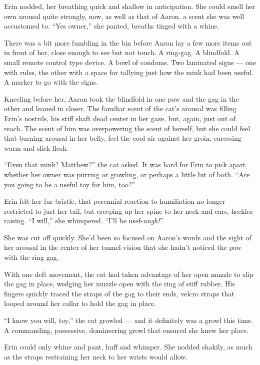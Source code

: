 \documentclass[12pt,letterpaper,oneside]{memoir}
\begin{document}
  Erin nodded, her breathing quick and shallow in anticipation. She could smell her own arousal quite strongly, now, as well as that of Aaron, a scent she was well accustomed to. ``Yes owner,'' she panted, breaths tinged with a whine.

  There was a bit more fumbling in the bin before Aaron lay a few more items out in front of her, close enough to see but not touch. A ring-gag. A blindfold. A small remote control type device. A bowl of condoms. Two laminated signs --- one with rules, the other with a space for tallying just how the mink had been useful. A marker to go with the signs.

  Kneeling before her, Aaron took the blindfold in one paw and the gag in the other and leaned in closer. The familiar scent of the cat's arousal was filling Erin's nostrils, his stiff shaft dead center in her gaze, but, again, just out of reach. The scent of him was overpowering the scent of herself, but she could feel that burning arousal in her belly, feel the cool air against her groin, caressing warm and slick flesh.

  ``Even that mink? Matthew?'' the cat asked. It was hard for Erin to pick apart whether her owner was purring or growling, or perhaps a little bit of both. ``Are you going to be a useful toy for him, too?''

  Erin felt her fur bristle, that perennial reaction to humiliation no longer restricted to just her tail, but creeping up her spine to her neck and ears, heckles raising. ``I will,'' she whimpered. ``I'll be usef-\textit{nngh!}''

  She was cut off quickly. She'd been so focused on Aaron's words and the sight of her arousal in the center of her tunnel-vision that she hadn't noticed the paw with the ring gag.

  With one deft movement, the cat had taken advantage of her open muzzle to slip the gag in place, wedging her muzzle open with the ring of stiff rubber. His fingers quickly traced the straps of the gag to their ends, velcro straps that looped around her collar to hold the gag in place.

  ``I know you will, toy,'' the cat growled --- and it definitely was a growl this time. A commanding, possessive, domineering growl that ensured she knew her place.

  Erin could only whine and pant, huff and whimper. She nodded shakily, as much as the straps restraining her neck to her wrists would allow.
\end{document}
